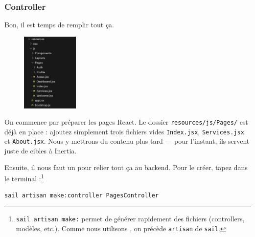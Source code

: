 \subsubsection[Controller][laravel.com/docs/12.x/controllers\#introduction]{Controller}

Bon, il est temps de remplir tout ça.

\begin{figure}
    \includegraphics[width=0.25\textwidth]{figures-C1/first_views.png}
\end{figure}


On commence par préparer les pages React.  
Le dossier \verb|resources/js/Pages/| est déjà en place : ajoutez simplement trois fichiers vides \verb|Index.jsx|, \verb|Services.jsx| et \verb|About.jsx|.  
Nous y mettrons du contenu plus tard — pour l’instant, ils servent juste de cibles à Inertia.

Ensuite, il nous faut un \controller{} pour relier tout ça au backend.  
Pour le créer, tapez dans le terminal :\footnote{\verb|sail artisan make:| permet de générer rapidement des fichiers (controllers, modèles, etc.).  
Comme nous utilisons \laravelsail{}, on précède \texttt{artisan} de \texttt{sail}.}

\begin{lstlisting}[language=bash]
sail artisan make:controller PagesController
\end{lstlisting}


